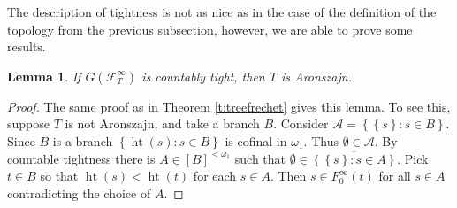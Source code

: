 \documentclass{amsart}
\theoremstyle{plain}
\newtheorem{lemma}[theorem]{Lemma}
\theoremstyle{definition}
\numberwithin{equation}{section}
\renewcommand{\o}{\omega}
\newcommand{\ps}{\emptyset}
\newcommand{\ft}{\mathcal F^{\infty}_T}
\newcommand{\set}[1]{\left\{#1\right\}}
\newcommand{\h}{\operatorname{ht}}
\begin{document}
The description of tightness is not as nice as in the case of the definition of the topology from the previous subsection, however, we are able to prove some results.

\begin{lemma}
	If $G(\ft)$ is countably tight, then $T$ is Aronszajn.
\end{lemma}
\begin{proof}
	The same proof as in Theorem \ref{t:treefrechet} gives this lemma.
	To see this, suppose $T$ is not Aronszajn, and take a branch $B$.
	Consider $\mathcal A=\set{\set{s}:s\in B}$.
	Since $B$ is a branch $\set{\h(s):s\in B}$ is cofinal in $\o_1$.
	Thus $\ps\in\overline{\mathcal A}$.
	By countable tightness there is $A\in [B]^{<\o_1}$ such that $\ps\in\overline{\set{\set{s}:s\in A}}$.
	Pick $t\in B$ so that $\h(s)<\h(t)$ for each $s\in A$.
	Then $s\in F^{\infty}_0(t)$ for all $s\in A$ contradicting the choice of $A$.
\end{proof}
\end{document}
